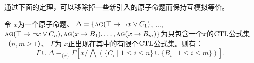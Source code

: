 
通过下面的定理，可以移除掉一些新引入的原子命题而保持互模拟等价。

\begin{lemma} \label{thm:Aclm}
	令 $x$为一个原子命题、 
	$\Delta = \{\textsc{a}\textsc{g}(\top \rightarrow \neg x \vee C_1)$, $\dots$, $\textsc{a}\textsc{g}(\top \rightarrow \neg x \vee C_n), \textsc{a}\textsc{g}(x \rightarrow B_1), \dots, \textsc{a}\textsc{g}(x \rightarrow B_m)\}$为只包含一个$x$的$\textrm{CTL}$公式集（$n, m \geq 1$）、
	$\Gamma$为 $x$正出现在其中的有限个$\textrm{CTL}$公式集。则有：
	\begin{equation}\label{eq:Ackermann:lemma}
		\Gamma\cup \Delta \equiv_{\{x\}}  
		\Gamma\left[x/\bigwedge\left(\{C_i\mid 1\le i\le n\}\cup\{B_i\mid 1\le i\le m\}\right)\right].
	\end{equation}
\end{lemma}
